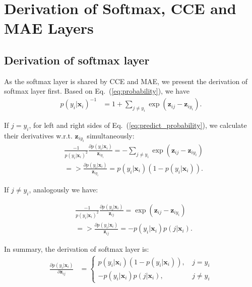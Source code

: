 \documentclass{article}
\begin{document}
\section{Derivation of Softmax, CCE and MAE Layers}

\subsection{Derivation of softmax layer}
As the softmax layer is shared by CCE and MAE, we present the derivation of softmax layer first. 
Based on Eq.~(\ref{eq:probability}), we have
\begin{equation}
\label{eq:predict_probability}
\begin{aligned}
p(y_i|\mathbf{x}_i)^{-1}
&= 1+\sum_{j\neq y_i} \exp(\mathbf{z}_{ij}-\mathbf{z}_{iy_i})
. 
\end{aligned}
\end{equation}




\noindent
If $j = y_i$, for left and right sides of Eq.~(\ref{eq:predict_probability}), we calculate their derivatives w.r.t. $\mathbf{z}_{iy_i}$ simultaneously:
\begin{equation}
\label{eq:both_prob_derivation_final_y_i}
\begin{aligned}
&\frac{-1}{p(y_i|\mathbf{x}_i)^2} 
\frac{\partial p(y_i|\mathbf{x}_i)}{\mathbf{z}_{iy_i}} 
= 
-\sum_{j\neq y_i} \exp(\mathbf{z}_{ij}-\mathbf{z}_{iy_i})
\\
&=>
\frac{\partial p(y_i|\mathbf{x}_i)}{\mathbf{z}_{iy_i}} 
= 
p(y_i|\mathbf{x}_i) 
(1-p(y_i|\mathbf{x}_i))
. 
\end{aligned}
\end{equation}




\noindent
If $j \neq y_i$, analogously we have:

\begin{equation}
\label{eq:both_prob_derivation_final_j}
\begin{aligned}
&\frac{-1}{p(y_i|\mathbf{x}_i)^2} 
\frac{\partial p(y_i|\mathbf{x}_i)}{\mathbf{z}_{ij}} = 
\exp(\mathbf{z}_{ij}-\mathbf{z}_{iy_i})\\
&=>
\frac{\partial p(y_i|\mathbf{x}_i)}{\mathbf{z}_{ij}} 
= 
-p(y_i|\mathbf{x}_i) 
p(j|\mathbf{x}_i)
. 
\end{aligned}
\end{equation}

\noindent
{In summary}, the derivation of softmax layer is:
\begin{equation}
\label{eq:both_prob_derivation_final}
\begin{aligned}
\frac{\partial p(y_i|\mathbf{x}_i)}{\partial \mathbf{z}_{ij}} 
&=
\begin{cases} 
p(y_i|\mathbf{x}_i) 
(1-p(y_i|\mathbf{x}_i))
\text{, } &j = y_i  \\
-p(y_i|\mathbf{x}_i) 
p(j|\mathbf{x}_i)  
\text{, } &j \neq y_i
\end{cases}
\end{aligned}
\end{equation}
\end{document}
